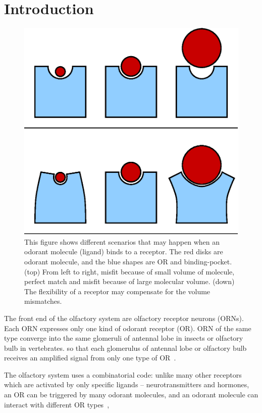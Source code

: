 \documentclass[11pt]{paper} %
\begin{document}
\section*{Introduction}
\begin{figure}
	\centering
	\includegraphics[width=0.4 \textwidth]{binding-pocket-size-flex}
	\caption{This figure shows different scenarios that may happen when an odorant molecule (ligand) binds to a receptor. 
		The red disks  are odorant molecule, 
		and the blue shapes are OR and binding-pocket.	
		(top) From left to right, misfit because of small volume of molecule, 
		perfect match and misfit because of large molecular volume.
		(down) The flexibility of a receptor may compensate for the volume mismatches.
		}
	\label{fig:binding-pocket}
\end{figure}


The front end of the olfactory system are olfactory receptor neurons (ORNs).  
Each ORN expresses only one kind of odorant receptor (OR). 
ORN of the same type converge into the same glomeruli of antennal lobe  in insects or olfactory bulb in vertebrates. 
so that each glomerulus of antennal lobe or olfactory bulb receives an amplified signal from only one type of OR~\cite{root2007,Carey2011,Vosshall2000,Couto2005,fishilevich2005,gao2000,wang1998,mombaerts1996,vassar1994}.

The olfactory system uses a combinatorial code: 
unlike many other receptors which are activated by only specific ligands -- neurotransmitters and hormones,
an OR can be triggered by many odorant molecules, 
and an odorant molecule can interact with different OR types~\cite{Malnic2000},
\end{document}
